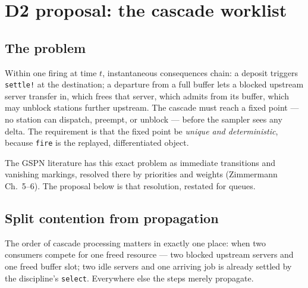 \documentclass[11pt]{article}
\newcommand{\code}[1]{\texttt{#1}}
\begin{document}
\section{D2 proposal: the cascade worklist}
\label{sec:cascade}

\subsection{The problem}

Within one firing at time $t$, instantaneous consequences chain: a deposit
triggers \code{settle!} at the destination; a departure from a full buffer
lets a blocked upstream server transfer in, which frees that server, which
admits from its buffer, which may unblock stations further upstream. The
cascade must reach a fixed point --- no station can dispatch, preempt, or
unblock --- before the sampler sees any delta. The requirement is that the
fixed point be \emph{unique and deterministic}, because \code{fire} is the
replayed, differentiated object.

The GSPN literature has this exact problem as immediate transitions and
vanishing markings, resolved there by priorities and weights (Zimmermann
Ch.~5--6). The proposal below is that resolution, restated for queues.

\subsection{Split contention from propagation}

The order of cascade processing matters in exactly one place: when two
consumers compete for one freed resource --- two blocked upstream servers and
one freed buffer slot; two idle servers and one arriving job is already
settled by the discipline's \code{select}. Everywhere else the steps merely
propagate.
\end{document}
